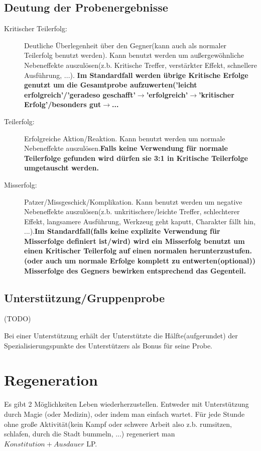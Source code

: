 \subsection{Deutung der Probenergebnisse}
\begin{description}
\item[Kritischer Teilerfolg:] Deutliche Überlegenheit über den Gegner(kann auch als normaler Teilerfolg benutzt werden). Kann benutzt werden um außergewöhnliche Nebeneffekte auszulösen(z.b. Kritische Treffer, verstärkter Effekt, schnellere Ausführung, ...).
\textbf{Im Standardfall werden übrige Kritische Erfolge genutzt um die Gesamtprobe aufzuwerten('leicht erfolgreich'/'geradeso geschafft'$\rightarrow$'erfolgreich'$\rightarrow$'kritischer Erfolg'/besonders gut$\rightarrow$...}
\item[Teilerfolg:] Erfolgreiche Aktion/Reaktion. Kann benutzt werden um normale Nebeneffekte auszulösen.\textbf{Falls keine Verwendung für normale Teilerfolge gefunden wird dürfen sie 3:1 in Kritische Teilerfolge umgetauscht werden.}
\item[Misserfolg:] Patzer/Missgeschick/Komplikation. Kann benutzt werden um negative Nebeneffekte auszulösen(z.b. unkritischere/leichte Treffer, schlechterer Effekt, langsamere Ausführung, Werkzeug geht kaputt, Charakter fällt hin, ...).\textbf{Im Standardfall(falls keine explizite Verwendung für Misserfolge definiert ist/wird) wird ein Misserfolg benutzt um einen Kritischer Teilerfolg auf einen normalen herunterzustufen.(oder auch um normale Erfolge komplett zu entwerten(optional)) Misserfolge des Gegners bewirken entsprechend das Gegenteil.}
\end{description}

\subsection{Unterstützung/Gruppenprobe}
(TODO)

Bei einer Unterstützung erhält der Unterstützte die Hälfte(aufgerundet) der Spezialisierungspunkte des Unterstützers als Bonus für seine Probe.

\section{Regeneration}
\label{vital}
Es gibt 2 Möglichkeiten Leben wiederherzustellen. Entweder mit Unterstützung durch Magie (oder Medizin), oder indem man einfach wartet. Für jede Stunde ohne große Aktivität(kein Kampf oder schwere Arbeit also z.b. rumsitzen, schlafen, durch die Stadt bummeln, ...) regeneriert man $Konstitution+Ausdauer$ LP.


